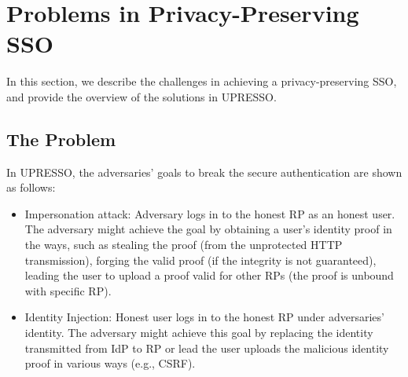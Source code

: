 \section{Problems in Privacy-Preserving SSO}
\label{sec:challenge}



In this section, we describe the challenges in achieving a privacy-preserving SSO, and provide the overview of the solutions in UPRESSO.


\subsection{The Problem}
\label{subsec:challenges}

In UPRESSO, the adversaries' goals to break the secure authentication are shown as follows:
\begin{itemize}
\item Impersonation attack: Adversary logs in to the honest RP as an honest user. The adversary might achieve the goal by obtaining a user's identity proof in the ways, such as stealing the proof (from the unprotected HTTP transmission), forging the valid proof (if the integrity is not guaranteed), leading the user to upload a proof valid for other RPs (the proof is unbound with specific RP). 
\item Identity Injection: Honest user logs in to the honest RP under adversaries' identity. The adversary might achieve this goal by replacing the identity transmitted from IdP to RP or lead the user uploads the malicious identity proof in various ways (e.g., CSRF).
\end{itemize}



